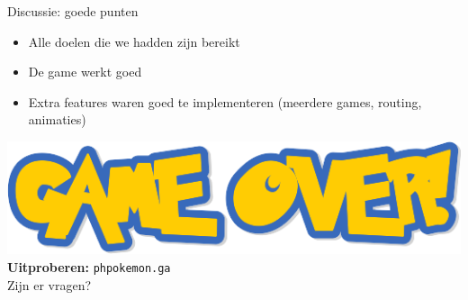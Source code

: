 \documentclass{beamer}
\begin{document}

\begin{frame}{Discussie: goede punten}
	\begin{itemize}
		\item Alle doelen die we hadden zijn bereikt
		\item De game werkt goed
		\item Extra features waren goed te implementeren (meerdere games, routing, animaties)
	\end{itemize}
\end{frame}


\begin{frame}[focus]
	\includegraphics[scale=0.4]{Images/Game-over-screen.png} \\
	\textbf{Uitproberen:} \texttt{phpokemon.ga} \\
	{\small Zijn er vragen?}
\end{frame}
\end{document}

